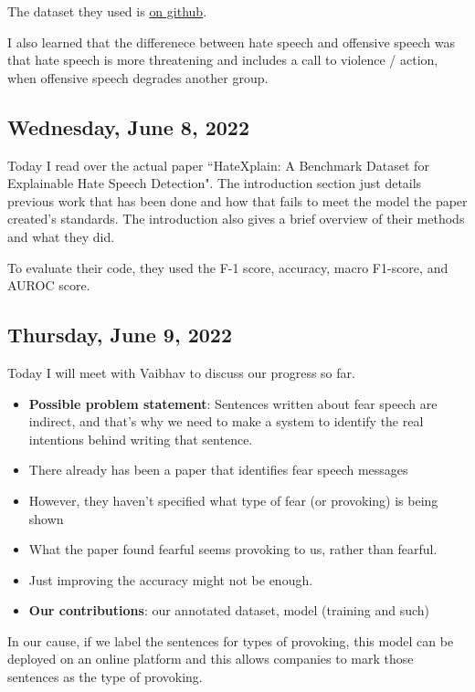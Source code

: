\documentclass[11pt,letterpaper]{article}
\begin{document}
The dataset they used is \href{https://github.com/hate-alert/HateXplain/blob/master/Data/dataset.json}{on github}.

I also learned that the differenece between hate speech and offensive speech was that hate speech is more threatening and includes a call to violence / action, when offensive speech degrades another group.

\subsection{Wednesday, June 8, 2022}
Today I read over the actual paper ``HateXplain: A Benchmark Dataset for Explainable Hate Speech Detection". The introduction section just details previous work that has been done and how that fails to meet the model the paper created's standards. The introduction also gives a brief overview of their methods and what they did.

To evaluate their code, they used the F-1 score, accuracy, macro F1-score, and AUROC score.

\subsection{Thursday, June 9, 2022}
Today I will meet with Vaibhav to discuss our progress so far.


\begin{itemize}
    \item \textbf{Possible problem statement}: Sentences written about fear speech are indirect, and that's why we need to make a system to identify the real intentions behind writing that sentence.
    \item There already has been a paper that identifies fear speech messages
    \item However, they haven't specified what type of fear (or provoking) is being shown 
    \item What the paper found fearful seems provoking to us, rather than fearful.
    \item Just improving the accuracy might not be enough.
    \item \textbf{Our contributions}: our annotated dataset, model (training and such)
\end{itemize}

In our cause, if we label the sentences for types of provoking, this model can be deployed on an online platform and this allows companies to mark those sentences as the type of provoking.
\end{document}
